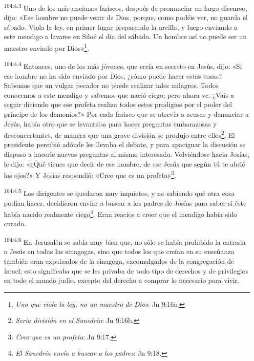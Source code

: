 \par
\textsuperscript{164:4.3} Uno de los más ancianos fariseos, después de pronunciar un largo discurso, dijo: «Ese hombre no puede venir de Dios, porque, como podéis ver, no guarda el sábado. Viola la ley, en primer lugar preparando la arcilla, y luego enviando a este mendigo a lavarse en Siloé el día del sábado. Un hombre así no puede ser un maestro enviado por Dios»\footnote{\textit{Uno que viola la ley, no un maestro de Dios}: Jn 9:16a.}.

\par
\textsuperscript{164:4.4} Entonces, uno de los más jóvenes, que creía en secreto en Jesús, dijo: «Si ese hombre no ha sido enviado por Dios, ¿cómo puede hacer estas cosas? Sabemos que un vulgar pecador no puede realizar tales milagros. Todos conocemos a este mendigo y sabemos que nació ciego; pero ahora ve. ¿Vais a seguir diciendo que ese profeta realiza todos estos prodigios por el poder del príncipe de los demonios?» Por cada fariseo que se atrevía a acusar y denunciar a Jesús, había otro que se levantaba para hacer preguntas embarazosas y desconcertantes, de manera que una grave división se produjo entre ellos\footnote{\textit{Seria división en el Sanedrín}: Jn 9:16b.}. El presidente percibió adónde les llevaba el debate, y para apaciguar la discusión se dispuso a hacerle nuevas preguntas al mismo interesado. Volviéndose hacia Josías, le dijo: «¿Qué tienes que decir de ese hombre, de ese Jesús que según tú te abrió los ojos?» Y Josías respondió: «Creo que es un profeta»\footnote{\textit{Creo que es un profeta}: Jn 9:17.}.

\par
\textsuperscript{164:4.5} Los dirigentes se quedaron muy inquietos, y no sabiendo qué otra cosa podían hacer, decidieron enviar a buscar a los padres de Josías para saber si éste había nacido realmente ciego\footnote{\textit{El Sanedrín envía a buscar a los padres}: Jn 9:18.}. Eran reacios a creer que el mendigo había sido curado.

\par
\textsuperscript{164:4.6} En Jerusalén se sabía muy bien que, no sólo se había prohibido la entrada a Jesús en todas las sinagogas, sino que todos los que creían en su enseñanza también eran expulsados de la sinagoga, excomulgados de la congregación de Israel; esto significaba que se les privaba de todo tipo de derechos y de privilegios en todo el mundo judío, excepto del derecho a comprar lo necesario para vivir.

